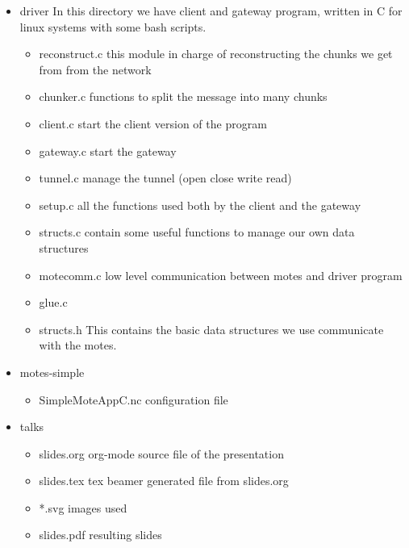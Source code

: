 \documentclass[11pt]{article}
\begin{document}
\begin{itemize}
\item driver
    In this directory we have client and gateway program, written in C for linux systems with some bash scripts.

\begin{itemize}
\item reconstruct.c
      this module in charge of reconstructing the chunks we get from from the network
\item chunker.c
      functions to split the message into many chunks
\item client.c
      start the client version of the program
\item gateway.c
      start the gateway
\item tunnel.c
      manage the tunnel (open close write read)
\item setup.c
      all the functions used both by the client and the gateway
\item structs.c
      contain some useful functions to manage our own data structures
\item motecomm.c
      low level communication between motes and driver program
\item glue.c
\item structs.h
      This contains the basic data structures we use communicate with the motes.
\end{itemize}

\item motes-simple

\begin{itemize}
\item SimpleMoteAppC.nc
      configuration file
\end{itemize}

\item talks

\begin{itemize}
\item slides.org
      org-mode source file of the presentation
\item slides.tex
      tex beamer generated file from slides.org
\item *.svg
      images used
\item slides.pdf
      resulting slides
\end{itemize}

\end{itemize}
\end{document}
